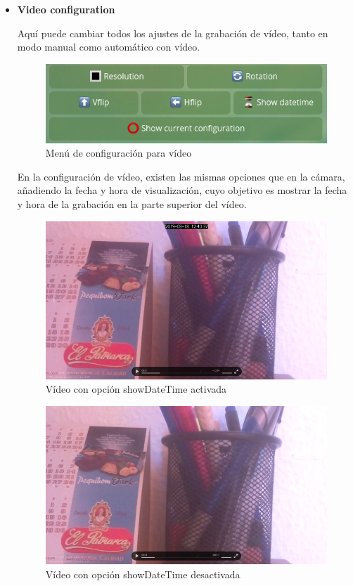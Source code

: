 \begin{itemize}
\item \textbf{Video configuration}

Aquí puede cambiar todos los ajustes de la grabación de vídeo, tanto en modo manual como automático con vídeo.

\begin{figure}[H]
	\centering
	\includegraphics[scale=0.4]{images/76}
	\caption{Menú de configuración para vídeo}
\end{figure}

En la configuración de vídeo, existen las mismas opciones que en la cámara, añadiendo la fecha y hora de visualización, cuyo objetivo es mostrar la fecha y hora de la grabación en la parte superior del vídeo.

\begin{figure}[H]
	\centering
	\includegraphics[scale=0.55]{images/77}
	\caption{Vídeo con opción showDateTime activada}
\end{figure}

\begin{figure}[H]
	\centering
	\includegraphics[scale=0.55]{images/78}
	\caption{Vídeo con opción showDateTime desactivada}
\end{figure}


\end{itemize}
